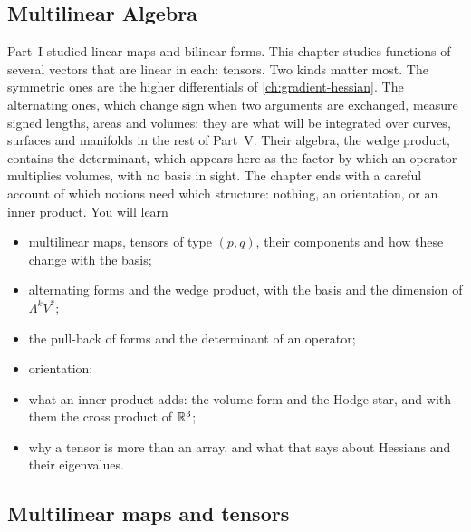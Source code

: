 \begin{notechapter}
\chapter{Multilinear Algebra}
\label{ch:multilinear-algebra}

\begin{chapterintro}
Part~I studied linear maps and bilinear forms. This chapter studies
functions of several vectors that are linear in each: tensors. Two
kinds matter most. The symmetric ones are the higher differentials of
\cref{ch:gradient-hessian}. The alternating ones, which change sign
when two arguments are exchanged, measure signed lengths, areas and
volumes: they are what will be integrated over curves, surfaces and
manifolds in the rest of Part~V. Their algebra, the wedge product,
contains the determinant, which appears here as the factor by which an
operator multiplies volumes, with no basis in sight. The chapter ends
with a careful account of which notions need which structure: nothing,
an orientation, or an inner product. You will learn
\begin{itemize}[nosep]
  \item multilinear maps, tensors of type $(p, q)$, their components and
        how these change with the basis;
  \item alternating forms and the wedge product, with the basis and the
        dimension of $\Lambda^kV^*$;
  \item the pull-back of forms and the determinant of an operator;
  \item orientation;
  \item what an inner product adds: the volume form and the Hodge star,
        and with them the cross product of $\mathbb{R}^3$;
  \item why a tensor is more than an array, and what that says about
        Hessians and their eigenvalues.
\end{itemize}
\end{chapterintro}

\section{Multilinear maps and tensors}\label{multilinear-algebra:sec:tensors}


\end{notechapter}
